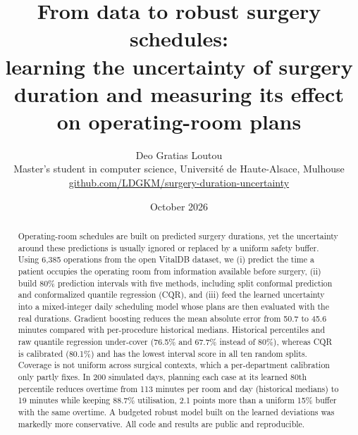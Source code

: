 \documentclass[11pt,a4paper]{article}
\title{\color{accent}\bfseries From data to robust surgery schedules:\\[2pt]
\large learning the uncertainty of surgery duration and measuring its effect on operating-room plans}
\author{Deo Gratias Loutou\\[2pt]\small Master's student in computer science, Université de Haute-Alsace, Mulhouse\\
\small \href{https://github.com/LDGKM/surgery-duration-uncertainty}{github.com/LDGKM/surgery-duration-uncertainty}}
\date{October 2026}
\begin{document}
\maketitle

\begin{abstract}
Operating-room schedules are built on predicted surgery durations, yet the uncertainty around these predictions
is usually ignored or replaced by a uniform safety buffer. Using 6{,}385 operations from the open VitalDB dataset, we
(i) predict the time a patient occupies the operating room from information available before surgery,
(ii) build 80\% prediction intervals with five methods, including split conformal prediction and conformalized
quantile regression (CQR), and (iii) feed the learned uncertainty into a mixed-integer daily scheduling model whose
plans are then evaluated with the real durations. Gradient boosting reduces the mean absolute error from 50.7 to
45.6 minutes compared with per-procedure historical medians. Historical percentiles and raw quantile regression
under-cover (76.5\% and 67.7\% instead of 80\%), whereas CQR is calibrated (80.1\%) and has the lowest interval score
in all ten random splits. Coverage is not uniform across surgical contexts, which a per-department calibration only
partly fixes. In 200 simulated days, planning each case at its learned 80th percentile reduces overtime from 113
minutes per room and day (historical medians) to 19 minutes while keeping 88.7\% utilisation, 2.1 points more than a
uniform 15\% buffer with the same overtime. A budgeted robust model built on the learned deviations was markedly more
conservative. All code and results are public and reproducible.
\end{abstract}
\end{document}
